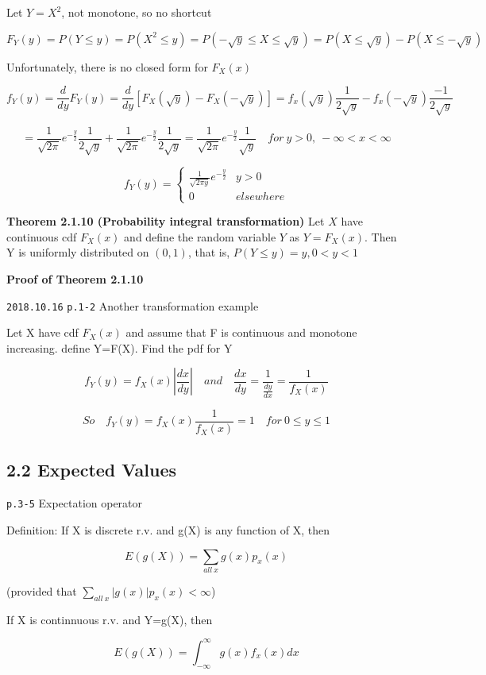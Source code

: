 \documentclass[]{tufte-book}
\begin{document}
Let \(Y=X^2\), not monotone, so no shortcut

\[F_Y(y)=P(Y\le y)=P(X^2\le y)=P(-\sqrt y\le X\le\sqrt y)=P(X\le\sqrt y)-P(X\le-\sqrt y)\]

Unfortunately, there is no closed form for \(F_X(x)\)

\[f_Y(y)=\frac{d}{dy}F_Y(y)=\frac{d}{dy}[F_X(\sqrt y)-F_X(-\sqrt y)]=f_x(\sqrt y)\frac1{2\sqrt y}-f_x(-\sqrt y)\frac{-1}{2\sqrt y}\]

\[=\frac1{\sqrt{2\pi}}e^{-\frac{y}2}\frac1{2\sqrt y}+\frac1{\sqrt{2\pi}}e^{-\frac{y}2}\frac1{2\sqrt y}=\frac1{\sqrt{2\pi}}e^{-\frac{y}2}\frac1{\sqrt y}\quad for\ y>0,\ -\infty<x<\infty\]

\[f_Y(y)=\begin{cases}\frac1{\sqrt{2\pi y}}e^{-\frac{y}2} &y>0\\0 &elsewhere\end{cases}\]

\textbf{Theorem 2.1.10 (Probability integral transformation)} Let \(X\)
have continuous cdf \(F_X(x)\) and define the random variable \(Y\) as
\(Y=F_X(x)\). Then Y is uniformly distributed on \((0,1)\), that is,
\(P(Y\le y)=y, 0<y<1\)

\textbf{Proof of Theorem 2.1.10}

\texttt{2018.10.16} \texttt{p.1-2} Another transformation example

Let X have cdf \(F_X(x)\) and assume that F is continuous and monotone
increasing. define Y=F(X). Find the pdf for Y

\[f_Y(y)=f_X(x)|\frac{dx}{dy}|\quad and\quad \frac{dx}{dy}=\frac1{\frac{dy}{dx}}=\frac1{f_X(x)}\]

\[So\quad f_Y(y)=f_X(x)\frac1{f_X(x)}=1\quad for\ 0\le y\le1\]

\hypertarget{expected-values}{%
\subsection{2.2 Expected Values}\label{expected-values}}

\texttt{p.3-5} Expectation operator

Definition: If X is discrete r.v. and g(X) is any function of X, then

\[E(g(X))=\sum_{all\ x}g(x)p_x(x)\]

(provided that \(\sum_{all\ x}|g(x)|p_x(x)<\infty\))

If X is continnuous r.v. and Y=g(X), then

\[E(g(X))=\int_{-\infty}^{\infty}g(x)f_x(x)dx\]
\end{document}
